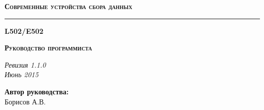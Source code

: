 \documentclass[12pt,a4paper,titlepage]{report}
\begin{document}
  \begin{titlepage}
    \topmargin=10mm
    \vspace{45mm}

    \begin{flushright}
    {\bfseries\scshape\Large Современные устройства сбора данных}
    \end{flushright}

    \rule{160mm}{2mm}                %

    \begin{flushright}
    {\bfseries\scshape\Huge L502/E502}
    \end{flushright}

    \begin{flushright}
    {\bfseries\scshape\Large Руководство программиста}
    \end{flushright}

    \vspace{155mm}


	
    \noindent
    \begin{flushright}
    {\itshape\footnotesize Ревизия 1.1.0 \\ Июнь 2015}
    \end{flushright}

  \end{titlepage}
  
  
  \vspace{5mm}
  \begin{flushleft}
  \textbf{Автор руководства:} \\
  Борисов А.В.
  \end{flushleft}
  
\end{document}
